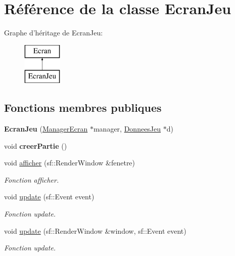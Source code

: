 \hypertarget{classEcranJeu}{\section{\-Référence de la classe \-Ecran\-Jeu}
\label{classEcranJeu}
}
\-Graphe d'héritage de \-Ecran\-Jeu\-:\begin{figure}[H]
\begin{center}
\leavevmode
\includegraphics[height=2.000000cm]{classEcranJeu}
\end{center}
\end{figure}
\subsection*{\-Fonctions membres publiques}
\begin{DoxyCompactItemize}
\item 
\hypertarget{classEcranJeu_a9b55b8830b8a1b7261ab440d529f6b6c}{{\bfseries \-Ecran\-Jeu} (\hyperlink{classManagerEcran}{\-Manager\-Ecran} $\ast$manager, \hyperlink{classDonneesJeu}{\-Donnees\-Jeu} $\ast$d)}\label{classEcranJeu_a9b55b8830b8a1b7261ab440d529f6b6c}

\item 
\hypertarget{classEcranJeu_a4acecc89a860064f7cb74e744ec931ff}{void {\bfseries creer\-Partie} ()}\label{classEcranJeu_a4acecc89a860064f7cb74e744ec931ff}

\item 
\hypertarget{classEcranJeu_a3181ea3bb30364a844c97c8436e89010}{void \hyperlink{classEcranJeu_a3181ea3bb30364a844c97c8436e89010}{afficher} (sf\-::\-Render\-Window \&fenetre)}\label{classEcranJeu_a3181ea3bb30364a844c97c8436e89010}

\begin{DoxyCompactList}\small\item\em \-Fonction afficher. \end{DoxyCompactList}\item 
\hypertarget{classEcranJeu_a8bfea524e61410dee2a2982d9b01bad4}{void \hyperlink{classEcranJeu_a8bfea524e61410dee2a2982d9b01bad4}{update} (sf\-::\-Event event)}\label{classEcranJeu_a8bfea524e61410dee2a2982d9b01bad4}

\begin{DoxyCompactList}\small\item\em \-Fonction update. \end{DoxyCompactList}\item 
\hypertarget{classEcranJeu_a1cd502e1daf0689ab931c73ec6103b45}{void \hyperlink{classEcranJeu_a1cd502e1daf0689ab931c73ec6103b45}{update} (sf\-::\-Render\-Window \&window, sf\-::\-Event event)}\label{classEcranJeu_a1cd502e1daf0689ab931c73ec6103b45}

\begin{DoxyCompactList}\small\item\em \-Fonction update. \end{DoxyCompactList}\end{DoxyCompactItemize}


